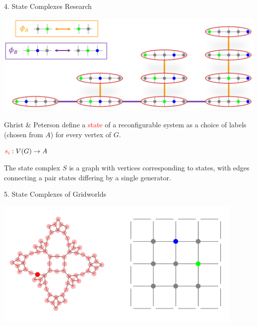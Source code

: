 \documentclass[
    a0paper, %
    landscape, %
    fontscale=0.3 %
    ]{baposter}
\begin{document}
\begin{poster}
\begin{posterbox}[
    name = scs,  %
    column = 1, %
    aligned=references,
    below=reconfigsys,
    above=futureresearch
    ]{4. State Complexes Research}
\begin{center}
\includegraphics[width=1\textwidth]{SC-example.PNG}
\vspace{-0.25cm}
\end{center}

Ghrist \& Peterson \cite{Ghrist-Peterson:2007} define a \textcolor{red}{state} of a reconfigurable system as a choice of labels (chosen from $A$) for every vertex of $G$.
\vspace{0.15cm}

$\textcolor{red}{s_i}:V(G) \rightarrow A$
\vspace{0.15cm}

The state complex $S$ is a graph with vertices corresponding to states, with edges connecting a pair states differing by a single generator.
\end{posterbox}



\begin{posterbox}[
    name = scsofgrids,  %
    column = 2, %
    span = 2,
    bottomaligned=grid,
    above=references
    ]{5. State Complexes of Gridworlds}
    
\begin{center}
    \includegraphics[width=0.9\textwidth]{petal-walk-1.PNG}
\end{center}


\end{posterbox}
\end{poster}
\end{document}
